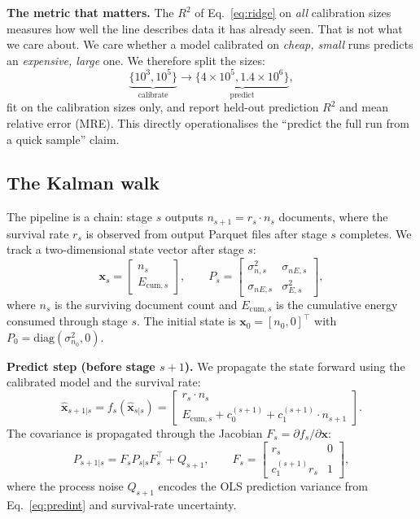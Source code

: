 \documentclass{article}
\begin{document}
\textbf{The metric that matters.} The $R^2$ of Eq.~\eqref{eq:ridge} on \emph{all} calibration sizes measures how well the line describes data it has already seen. That is not what we care about. We care whether a model calibrated on \emph{cheap, small} runs predicts an \emph{expensive, large} one. We therefore split the sizes:
\[
  \underbrace{\{10^3, 10^5\}}_{\text{calibrate}}
  \longrightarrow
  \underbrace{\{4{\times}10^5, 1.4{\times}10^6\}}_{\text{predict}},
\]
fit on the calibration sizes only, and report held-out prediction $R^2$ and mean relative error (MRE). This directly operationalises the ``predict the full run from a quick sample'' claim.

\subsection{The Kalman walk}

\label{sec:ekf}

The pipeline is a chain: stage $s$ outputs $n_{s+1} = r_s \cdot n_s$ documents, where the survival rate $r_s$ is observed from output Parquet files after stage $s$ completes. We track a two-dimensional state vector after stage $s$:
\begin{equation}
  \mathbf{x}_s = \begin{bmatrix} n_s \\ E_{\mathrm{cum},s} \end{bmatrix},
  \qquad
  P_s = \begin{bmatrix} \sigma^2_{n,s} & \sigma_{nE,s} \\ \sigma_{nE,s} & \sigma^2_{E,s} \end{bmatrix},
  \label{eq:state}
\end{equation}
where $n_s$ is the surviving document count and $E_{\mathrm{cum},s}$ is the cumulative energy consumed through stage $s$. The initial state is $\mathbf{x}_0 = [n_0, 0]^\top$ with $P_0 = \mathrm{diag}(\sigma^2_{n_0}, 0)$.

\textbf{Predict step (before stage $s+1$).} We propagate the state forward using the calibrated model and the survival rate:
\begin{equation}
  \hat{\mathbf{x}}_{s+1|s} = f_s(\hat{\mathbf{x}}_{s|s}) =
  \begin{bmatrix}
    r_s \cdot n_s \\
    E_{\mathrm{cum},s} + c_0^{(s+1)} + c_1^{(s+1)} \cdot n_{s+1}
  \end{bmatrix}.
  \label{eq:transition}
\end{equation}
The covariance is propagated through the Jacobian $F_s = \partial f_s / \partial \mathbf{x}$:
\begin{equation}
  P_{s+1|s} = F_s P_{s|s} F_s^\top + Q_{s+1},
  \qquad
  F_s = \begin{bmatrix} r_s & 0 \\ c_1^{(s+1)} r_s & 1 \end{bmatrix},
  \label{eq:covprop}
\end{equation}
where the process noise $Q_{s+1}$ encodes the OLS prediction variance from Eq.~\eqref{eq:predint} and survival-rate uncertainty.
\end{document}
